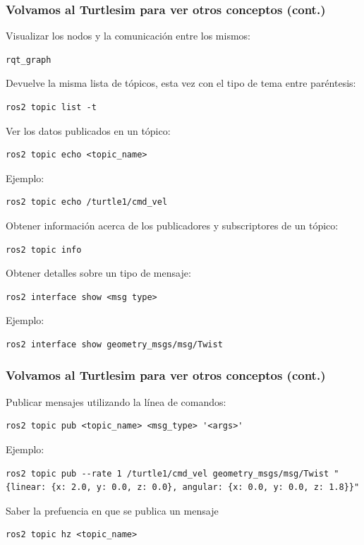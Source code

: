 \begin{frame}[fragile]
    \frametitle{Volvamos al Turtlesim para ver otros conceptos (cont.)}
	\footnotesize
	
Visualizar los nodos y la comunicación entre los mismos:
\begin{lstlisting}[style=bash]  
rqt_graph
\end{lstlisting}

Devuelve la misma lista de tópicos, esta vez con el tipo de tema entre paréntesis:
\begin{lstlisting}[style=bash]  
ros2 topic list -t
\end{lstlisting}
    
Ver los datos publicados en un tópico:
\begin{lstlisting}[style=bash]  
ros2 topic echo <topic_name>
\end{lstlisting}
    
Ejemplo:
\begin{lstlisting}[style=bash]  
ros2 topic echo /turtle1/cmd_vel
\end{lstlisting}
    
Obtener información acerca de los publicadores y subscriptores de un tópico:
\begin{lstlisting}[style=bash]  
ros2 topic info
\end{lstlisting}
    
Obtener detalles sobre un tipo de mensaje:
\begin{lstlisting}[style=bash]  
ros2 interface show <msg type>
\end{lstlisting}    

Ejemplo:
\begin{lstlisting}[style=bash]  
ros2 interface show geometry_msgs/msg/Twist
\end{lstlisting}    

\end{frame}

\begin{frame}[fragile]
	\frametitle{Volvamos al Turtlesim para ver otros conceptos (cont.)}
Publicar mensajes utilizando la línea de comandos:
\begin{lstlisting}[style=bash]  
ros2 topic pub <topic_name> <msg_type> '<args>'
\end{lstlisting}    
Ejemplo:
\begin{lstlisting}[style=bash,basicstyle=tiny]  
ros2 topic pub --rate 1 /turtle1/cmd_vel geometry_msgs/msg/Twist "{linear: {x: 2.0, y: 0.0, z: 0.0}, angular: {x: 0.0, y: 0.0, z: 1.8}}"
\end{lstlisting}    
Saber la prefuencia en que se publica un mensaje
\begin{lstlisting}[style=bash]  
ros2 topic hz <topic_name>
\end{lstlisting}
    
\end{frame}

